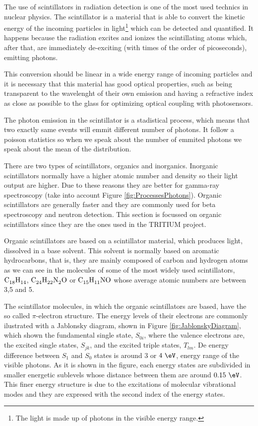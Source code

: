 The use of scintillators in radiation detection is one of the most used technics in nuclear physics. The scintillator is a material that is able to convert the kinetic energy of the incoming particles in light\footnote{The light is made up of photons in the visible energy range.} which can be detected and quantified. It happens because the radiation excites and ionizes the scintillating atoms which, after that, are immediately de-exciting (with times of the order of picoseconds), emitting photons.

This conversion should be linear in a wide energy range of incoming particles and it is necessary that this material has good optical properties, such as being transparent to the wavelenght of their own emission and having a refractive index as close as possible to the glass for optimizing optical coupling with photosensors.

The photon emission in the scintillator is a stadistical process, which means that two exactly same events will emmit different number of photons. It follow a poisson statistics so when we speak about the number of emmited photons we speak about the mean of the distribution.

There are two types of scintillators, organics and inorganics. Inorganic scintillators normally have a higher atomic number and density so their light output are higher. Due to these reasons they are better for gamma-ray spectroscopy (take into account Figure \ref{fig:ProcessesPhotons}). Organic scintillators are generally faster and they are commonly used for beta spectroscopy and neutron detection. This section is focussed on organic scintillators since they are the ones used in the TRITIUM project. 

Organic scintillators are based on a scintillator material, which produces light, dissolved in a base solvent. This solvent is normally based on aromatic hydrocarbons, that is, they are mainly composed of carbon and hydrogen atoms as we can see in the molecules of some of the most widely used scintillators, $\ce{C_{18}H_{14}}$, $\ce{C_{24}H_{22}N_{2}O}$ or $\ce{C_{15}H_{11}NO}$ whose average atomic numbers are between 3,5 and 5.

The scintillator molecules, in which the organic scintillators are based, have the so called $\pi$-electron structure. The energy levels of their electrons are commonly ilustrated with a Jablonsky diagram, shown in Figure \ref{fig:JablonskyDiagram}, which shown the fundamental single state, $S_{0i}$, where the valence electrons are, the excited single states, $S_{jk}$, and the excited triple states, $T_{lm}$. De energy difference between $S_1$ and $S_0$ states is around $3$ or $4~\eV$, energy range of the visible photons. As it is shown in the figure, each energy states are subdivided in smaller energetic sublevels whose distance between them are around $0.15~\eV$. This finer energy structure is due to the excitations of molecular vibrational modes and they are expresed with the second index of the energy states.

